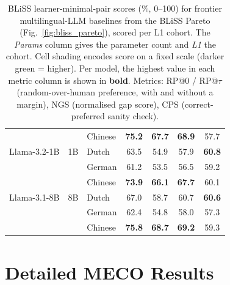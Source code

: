 \begin{table}[t]
\begin{minipage}[t]{0.49\linewidth}
\begin{tabular}{ll l cccc}
 &  & Chinese & \cellcolor[rgb]{0.737,1.000,0.737} \textbf{75.2} & \cellcolor[rgb]{0.777,1.000,0.777} \textbf{67.7} & \cellcolor[rgb]{0.750,1.000,0.750} \textbf{68.9} & \cellcolor[rgb]{0.843,1.000,0.843} 57.7 \\
\addlinespace[2pt]
Llama-3.2-1B & 1B & Dutch & \cellcolor[rgb]{0.859,1.000,0.859} 63.5 & \cellcolor[rgb]{0.938,1.000,0.938} 54.9 & \cellcolor[rgb]{0.895,1.000,0.895} 57.9 & \cellcolor[rgb]{0.779,1.000,0.779} \textbf{60.8} \\
 &  & German & \cellcolor[rgb]{0.883,1.000,0.883} 61.2 & \cellcolor[rgb]{0.956,1.000,0.956} 53.5 & \cellcolor[rgb]{0.914,1.000,0.914} 56.5 & \cellcolor[rgb]{0.812,1.000,0.812} 59.2 \\
 &  & Chinese & \cellcolor[rgb]{0.751,1.000,0.751} \textbf{73.9} & \cellcolor[rgb]{0.797,1.000,0.797} \textbf{66.1} & \cellcolor[rgb]{0.766,1.000,0.766} \textbf{67.7} & \cellcolor[rgb]{0.793,1.000,0.793} 60.1 \\
\addlinespace[2pt]
Llama-3.1-8B & 8B & Dutch & \cellcolor[rgb]{0.823,1.000,0.823} 67.0 & \cellcolor[rgb]{0.890,1.000,0.890} 58.7 & \cellcolor[rgb]{0.858,1.000,0.858} 60.7 & \cellcolor[rgb]{0.783,1.000,0.783} \textbf{60.6} \\
 &  & German & \cellcolor[rgb]{0.871,1.000,0.871} 62.4 & \cellcolor[rgb]{0.939,1.000,0.939} 54.8 & \cellcolor[rgb]{0.894,1.000,0.894} 58.0 & \cellcolor[rgb]{0.851,1.000,0.851} 57.3 \\
 &  & Chinese & \cellcolor[rgb]{0.731,1.000,0.731} \textbf{75.8} & \cellcolor[rgb]{0.764,1.000,0.764} \textbf{68.7} & \cellcolor[rgb]{0.746,1.000,0.746} \textbf{69.2} & \cellcolor[rgb]{0.810,1.000,0.810} 59.3 \\
\bottomrule
\end{tabular}
\end{minipage}
\caption{BLiSS learner-minimal-pair scores (\%, 0--100) for frontier multilingual-LLM baselines from the BLiSS Pareto (Fig.~\ref{fig:bliss_pareto}), scored per L1 cohort. The \emph{Params} column gives the parameter count and \emph{L1} the cohort. Cell shading encodes score on a fixed scale (darker green = higher). Per model, the highest value in each metric column is shown in \textbf{bold}. Metrics: RP@0 / RP@$\tau$ (random-over-human preference, with and without a margin), NGS (normalised gap score), CPS (correct-preferred sanity check).}
\label{tab:bliss_baselines}
\end{table}


\section{Detailed \beetle{} MECO Results}\label{sec:meco-results}
 
